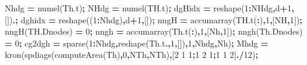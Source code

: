 \documentclass[
]{article}
\newenvironment{Shaded}{\begin{snugshade}}{\end{snugshade}}
\newcommand{\FloatTok}[1]{\textcolor[rgb]{0.00,0.00,0.81}{#1}}
\newcommand{\NormalTok}[1]{#1}
\newcommand{\OperatorTok}[1]{\textcolor[rgb]{0.81,0.36,0.00}{\textbf{#1}}}
\newcommand{\VariableTok}[1]{\textcolor[rgb]{0.00,0.00,0.00}{#1}}
\begin{document}
\begin{Shaded}
\begin{Highlighting}[]
\VariableTok{Nhdg} \OperatorTok{=} \VariableTok{numel}\NormalTok{(}\VariableTok{Th}\NormalTok{.}\VariableTok{t}\NormalTok{)}\OperatorTok{;}
\VariableTok{NHdg} \OperatorTok{=} \VariableTok{numel}\NormalTok{(}\VariableTok{TH}\NormalTok{.}\VariableTok{t}\NormalTok{)}\OperatorTok{;}
\VariableTok{dgHidx} \OperatorTok{=} \VariableTok{reshape}\NormalTok{(}\FloatTok{1}\OperatorTok{:}\VariableTok{NHdg}\OperatorTok{,}\VariableTok{d}\OperatorTok{+}\FloatTok{1}\OperatorTok{,}\NormalTok{[])}\OperatorTok{.\textquotesingle{};}
\VariableTok{dghidx} \OperatorTok{=} \VariableTok{reshape}\NormalTok{((}\FloatTok{1}\OperatorTok{:}\VariableTok{Nhdg}\NormalTok{)}\OperatorTok{,}\VariableTok{d}\OperatorTok{+}\FloatTok{1}\OperatorTok{,}\NormalTok{[])}\OperatorTok{\textquotesingle{};}
\VariableTok{nngH} \OperatorTok{=} \VariableTok{accumarray}\NormalTok{(}\VariableTok{TH}\NormalTok{.}\VariableTok{t}\NormalTok{(}\OperatorTok{:}\NormalTok{)}\OperatorTok{,}\FloatTok{1}\OperatorTok{,}\NormalTok{[}\VariableTok{NH}\OperatorTok{,}\FloatTok{1}\NormalTok{])}\OperatorTok{;} \VariableTok{nngH}\NormalTok{(}\VariableTok{TH}\NormalTok{.}\VariableTok{Dnodes}\NormalTok{) }\OperatorTok{=} \FloatTok{0}\OperatorTok{;}
\VariableTok{nngh} \OperatorTok{=} \VariableTok{accumarray}\NormalTok{(}\VariableTok{Th}\NormalTok{.}\VariableTok{t}\NormalTok{(}\OperatorTok{:}\NormalTok{)}\OperatorTok{,}\FloatTok{1}\OperatorTok{,}\NormalTok{[}\VariableTok{Nh}\OperatorTok{,}\FloatTok{1}\NormalTok{])}\OperatorTok{;} \VariableTok{nngh}\NormalTok{(}\VariableTok{Th}\NormalTok{.}\VariableTok{Dnodes}\NormalTok{) }\OperatorTok{=} \FloatTok{0}\OperatorTok{;}
\VariableTok{cg2dgh} \OperatorTok{=} \VariableTok{sparse}\NormalTok{(}\FloatTok{1}\OperatorTok{:}\VariableTok{Nhdg}\OperatorTok{,}\VariableTok{reshape}\NormalTok{(}\VariableTok{Th}\NormalTok{.}\VariableTok{t}\OperatorTok{.\textquotesingle{},}\FloatTok{1}\OperatorTok{,}\NormalTok{[])}\OperatorTok{,}\FloatTok{1}\OperatorTok{,}\VariableTok{Nhdg}\OperatorTok{,}\VariableTok{Nh}\NormalTok{)}\OperatorTok{;}
\VariableTok{Mhdg} \OperatorTok{=} \VariableTok{kron}\NormalTok{(}\VariableTok{spdiags}\NormalTok{(}\VariableTok{computeArea}\NormalTok{(}\VariableTok{Th}\NormalTok{)}\OperatorTok{,}\FloatTok{0}\OperatorTok{,}\VariableTok{NTh}\OperatorTok{,}\VariableTok{NTh}\NormalTok{)}\OperatorTok{,}\NormalTok{[}\FloatTok{2} \FloatTok{1} \FloatTok{1}\OperatorTok{;}\FloatTok{1} \FloatTok{2} \FloatTok{1}\OperatorTok{;}\FloatTok{1} \FloatTok{1} \FloatTok{2}\NormalTok{]}\OperatorTok{./}\FloatTok{12}\NormalTok{)}\OperatorTok{;}

\end{Highlighting}
\end{Shaded}
\end{document}
